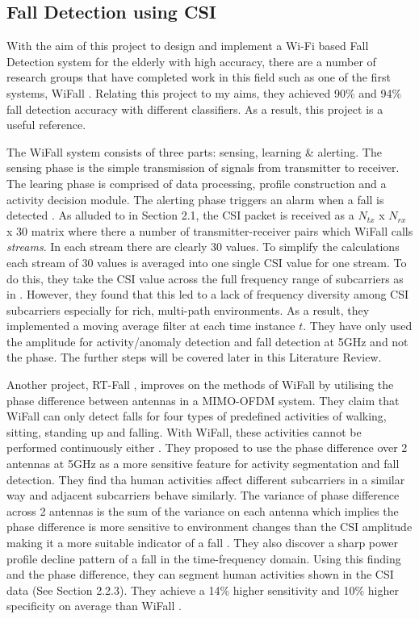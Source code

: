 \subsection{Fall Detection using CSI}
With the aim of this project to design and implement a Wi-Fi based Fall Detection system for the elderly with high accuracy, there are a number of research groups that have completed work in this field such as one of the first systems, WiFall \citep{WiFall}. Relating this project to my aims, they achieved 90\% and 94\% fall detection accuracy with different classifiers. As a result, this project is a useful reference. \par
The WiFall system consists of three parts: sensing, learning \& alerting. The sensing phase is the simple transmission of signals from transmitter to receiver. The learing phase is comprised of data processing, profile construction and a activity decision module. The alerting phase triggers an alarm when a fall is detected \citep{WiFall}. As alluded to in Section 2.1, the CSI packet is received as a $N_{tx}$ x $N_{rx}$ x 30 matrix where there a number of transmitter-receiver pairs which WiFall calls \textit{streams}. In each stream there are clearly 30 values. To simplify the calculations each stream of 30 values is averaged into one single CSI value for one stream. To do this, they take the CSI value across the full frequency range of subcarriers as in \cite{FilaIndoor}. However, they found that this led to a lack of frequency diversity among CSI subcarriers especially for rich, multi-path environments. As a result, they implemented a moving average filter at each time instance $t$. They have only used the amplitude for activity/anomaly detection and fall detection at 5GHz and not the phase. The further steps will be covered later in this Literature Review. \par
Another project, RT-Fall \cite{RTFall}, improves on the methods of WiFall by utilising the phase difference between antennas in a MIMO-OFDM system. They claim that WiFall can only detect falls for four types of predefined activities of walking, sitting, standing up and falling. With WiFall, these activities cannot be performed continuously either \citep{RTFall}. They proposed to use the phase difference over 2 antennas at 5GHz as a more sensitive feature for activity segmentation and fall detection. They find tha human activities affect different subcarriers in a similar way and adjacent subcarriers behave similarly. The variance of phase difference across 2 antennas is the sum of the variance on each antenna which implies the phase difference is more sensitive to environment changes than the CSI amplitude making it a more suitable indicator of a fall \citep{PhaseU}. They also discover a sharp power profile decline pattern of a fall in the time-frequency domain. Using this finding and the phase difference, they can segment human activities shown in the CSI data (See Section 2.2.3). They achieve a 14\% higher sensitivity and 10\% higher specificity on average than WiFall \citep{RTFall}.
